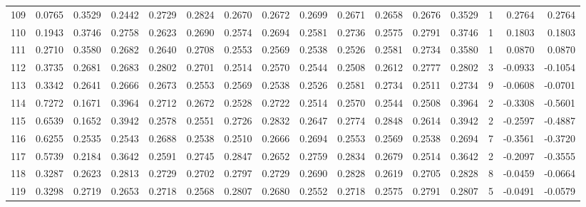 \begin{tabular}{lrrrrrrrrrrrrrrr}
109 &      0.0765 &  0.3529 &  0.2442 &  0.2729 &  0.2824 &  0.2670 &  0.2672 &  0.2699 &  0.2671 &  0.2658 &   0.2676 &     0.3529 &      1 &                    0.2764 &                     0.2764 \\
110 &      0.1943 &  0.3746 &  0.2758 &  0.2623 &  0.2690 &  0.2574 &  0.2694 &  0.2581 &  0.2736 &  0.2575 &   0.2791 &     0.3746 &      1 &                    0.1803 &                     0.1803 \\
111 &      0.2710 &  0.3580 &  0.2682 &  0.2640 &  0.2708 &  0.2553 &  0.2569 &  0.2538 &  0.2526 &  0.2581 &   0.2734 &     0.3580 &      1 &                    0.0870 &                     0.0870 \\
112 &      0.3735 &  0.2681 &  0.2683 &  0.2802 &  0.2701 &  0.2514 &  0.2570 &  0.2544 &  0.2508 &  0.2612 &   0.2777 &     0.2802 &      3 &                   -0.0933 &                    -0.1054 \\
113 &      0.3342 &  0.2641 &  0.2666 &  0.2673 &  0.2553 &  0.2569 &  0.2538 &  0.2526 &  0.2581 &  0.2734 &   0.2511 &     0.2734 &      9 &                   -0.0608 &                    -0.0701 \\
114 &      0.7272 &  0.1671 &  0.3964 &  0.2712 &  0.2672 &  0.2528 &  0.2722 &  0.2514 &  0.2570 &  0.2544 &   0.2508 &     0.3964 &      2 &                   -0.3308 &                    -0.5601 \\
115 &      0.6539 &  0.1652 &  0.3942 &  0.2578 &  0.2551 &  0.2726 &  0.2832 &  0.2647 &  0.2774 &  0.2848 &   0.2614 &     0.3942 &      2 &                   -0.2597 &                    -0.4887 \\
116 &      0.6255 &  0.2535 &  0.2543 &  0.2688 &  0.2538 &  0.2510 &  0.2666 &  0.2694 &  0.2553 &  0.2569 &   0.2538 &     0.2694 &      7 &                   -0.3561 &                    -0.3720 \\
117 &      0.5739 &  0.2184 &  0.3642 &  0.2591 &  0.2745 &  0.2847 &  0.2652 &  0.2759 &  0.2834 &  0.2679 &   0.2514 &     0.3642 &      2 &                   -0.2097 &                    -0.3555 \\
118 &      0.3287 &  0.2623 &  0.2813 &  0.2729 &  0.2702 &  0.2797 &  0.2729 &  0.2690 &  0.2828 &  0.2619 &   0.2705 &     0.2828 &      8 &                   -0.0459 &                    -0.0664 \\
119 &      0.3298 &  0.2719 &  0.2653 &  0.2718 &  0.2568 &  0.2807 &  0.2680 &  0.2552 &  0.2718 &  0.2575 &   0.2791 &     0.2807 &      5 &                   -0.0491 &                    -0.0579 \\

\end{tabular}
